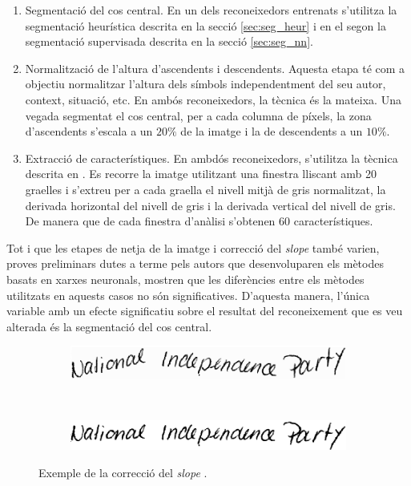 \begin{enumerate}
\item Segmentació del cos central. En un dels reconeixedors entrenats s'utilitza la segmentació heurística descrita en la secció \ref{sec:seg_heur} i en el segon la segmentació supervisada descrita en la secció \ref{sec:seg_nn}.

\item Normalització de l'altura d'ascendents i descendents. Aquesta etapa té com a objectiu normalitzar l'altura dels símbols independentment del seu autor, context, situació, etc. En ambós reconeixedors, la tècnica és la mateixa. Una vegada segmentat el cos central, per a cada columna de píxels, la zona d'ascendents s'escala a un $20\%$ de la imatge i la de descendents a un $10\%$.

\item Extracció de característiques. En ambdós reconeixedors, s'utilitza la tècnica descrita en \cite{toselli2004integrated,Pastor07}. Es recorre la imatge utilitzant una finestra lliscant amb 20 graelles i s'extreu per a cada graella el nivell mitjà de gris normalitzat, la derivada horizontal del nivell de gris i la derivada vertical del nivell de gris. De manera que de cada finestra d'anàlisi s'obtenen 60 característiques.
\end{enumerate}
Tot i que les etapes de netja de la imatge i correcció del \emph{slope} també varien, proves preliminars dutes a terme pels autors que desenvoluparen els mètodes basats en xarxes neuronals, mostren que les diferències entre els mètodes utilitzats en aquests casos no són significatives. D'aquesta manera, l'única variable amb un efecte significatiu sobre el resultat del reconeixement que es veu alterada és la segmentació del cos central.

\begin{figure}
\centering
\begin{subfigure}[b]{0.8\textwidth}
\centering
\includegraphics[width=\textwidth]{images/slope_orig.eps}
\caption{}\label{fig:slope_correction_orig}
\end{subfigure}\\
\begin{subfigure}[b]{0.8\textwidth}
\centering
\includegraphics[width=\textwidth]{images/slope_corr.eps}
\caption{}\label{fig:slope_correction_result}
\end{subfigure}
\caption{Exemple de la correcció del \emph{slope} \cite{Pastor07}.}\label{fig:slope_correction}
\end{figure}

